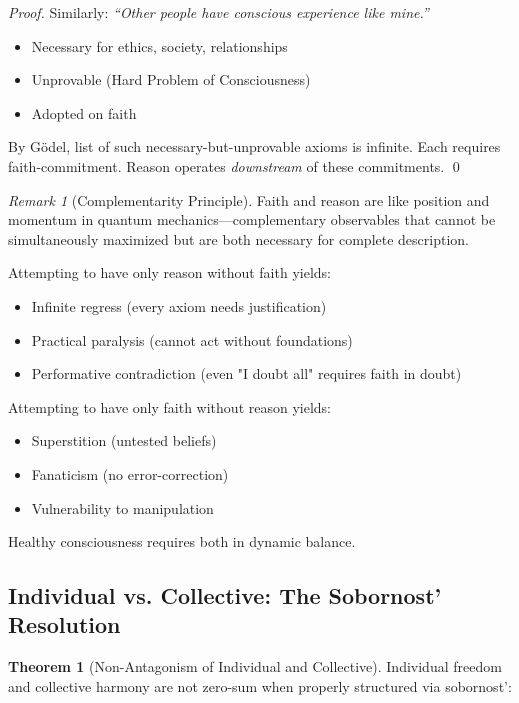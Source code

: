\documentclass[11pt,a4paper]{article}
\theoremstyle{definition}
\newtheorem{theorem}{Theorem}[section]
\theoremstyle{remark}
\newtheorem{remark}{Remark}[section]
\begin{document}
\begin{small}
\begin{enumerate}
\begin{proof}
Similarly: \textit{``Other people have conscious experience like mine.''}
\begin{itemize}
    \item Necessary for ethics, society, relationships
    \item Unprovable (Hard Problem of Consciousness)
    \item Adopted on faith
\end{itemize}

By Gödel, list of such necessary-but-unprovable axioms is infinite. Each requires faith-commitment. Reason operates \textit{downstream} of these commitments. \qed
\end{proof}

\begin{remark}[Complementarity Principle]
Faith and reason are like position and momentum in quantum mechanics—complementary observables that cannot be simultaneously maximized but are both necessary for complete description.

Attempting to have only reason without faith yields:
\begin{itemize}
    \item Infinite regress (every axiom needs justification)
    \item Practical paralysis (cannot act without foundations)
    \item Performative contradiction (even "I doubt all" requires faith in doubt)
\end{itemize}

Attempting to have only faith without reason yields:
\begin{itemize}
    \item Superstition (untested beliefs)
    \item Fanaticism (no error-correction)
    \item Vulnerability to manipulation
\end{itemize}

Healthy consciousness requires both in dynamic balance.
\end{remark}

\subsection{Individual vs. Collective: The Sobornost' Resolution}

\begin{theorem}[Non-Antagonism of Individual and Collective]
Individual freedom and collective harmony are not zero-sum when properly structured via sobornost':


\end{theorem}
\end{enumerate}
\end{small}
\end{document}
